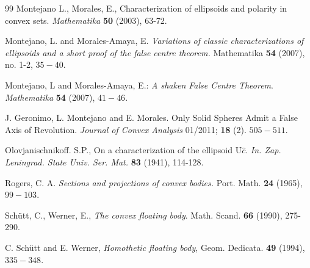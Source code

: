 \documentclass[12pt]{amsart}
\begin{document}
\begin{thebibliography}{99}
 Montejano L., Morales, E., Characterization of ellipsoids and polarity in convex sets. 
\emph{Mathematika} \textbf{50} (2003), 63-72.



 Montejano, L. and Morales-Amaya, E. \emph{Variations of classic characterizations of ellipsoids and a short proof of the false centre theorem.} Mathematika {\bf 54} (2007), no. 1-2, $35-40$.

 Montejano, L and Morales-Amaya, E.: \emph{A shaken False Centre Theorem}.  \textit{Ma\-the\-ma\-ti\-ka} \textbf{54} (2007), $41-46$.

 J. Geronimo, L. Montejano and E. Morales.  Only Solid Spheres Admit a False Axis of Revolution. \textit{Journal of Convex Analysis} 01/2011; \textbf{18} (2). $505-511$.

 Olovjanischnikoff. S.P., On a characterization of the ellipsoid 
U$\hat{c}$.  \emph{In. Zap. Leningrad. State Univ. Ser. Mat.}  \textbf{83} (1941), 114-128.
 

 Rogers, C. A.  \emph{Sections and projections of convex bodies.} Port. Math. {\bf 24} (1965), $99-103$.
 
 Sch\"{u}tt, C., Werner, E., \emph{The convex floating body}. Math. Scand. {\bf66} (1990), 275-290.
 
  C. Sch\"{u}tt and E. Werner, \emph{Homothetic floating body}, Geom. Dedicata. {\bf 49}
(1994), $335-348$. 
\end{thebibliography}
 
\end{document}
